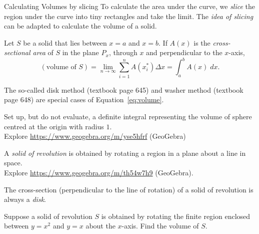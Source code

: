 \documentclass[../main.tex]{subfiles}
\begin{document}
\begin{lesson}{Calculating Volumes by slicing}
  To calculate the area under the curve, we \emph{slice} the region under the curve into tiny rectangles and take the limit. The \emph{idea of slicing} can be adapted to calculate the volume of a solid.

  \begin{mdframed}[style=withref]
    Let \(S\) be a solid that lies between \(x=a\) and \(x=b\). If \(A(x)\) is the \emph{cross-sectional area} of \(S\) in the plane \(P_{x}\), through \(x\) and perpendicular to the \(x\)-axis, 
    \begin{equation} \label{eq:volume}
      (\text{volume of } S) = \lim_{n \to \infty} \sum_{i=1}^{n} A(x_{i}^{*}) \Delta x = \int_{a}^{b} A(x) \;dx.
    \end{equation}

    The so-called disk method (textbook page 645) and washer method (textbook page 648) are special cases of Equation~\eqref{eq:volume}.
  \end{mdframed}
  \vspace{2in}

  \begin{example}
    Set up, but do not evaluate, a definite integral representing the volume of sphere centred at the origin with radius $1$. \\
    {\footnotesize Explore \url{https://www.geogebra.org/m/yse5hfrf} (GeoGebra)}
  \end{example}
  \clearpage


  A \emph{solid of revolution} is obtained by rotating a region in a plane about a line in space. \\
  {\footnotesize Explore \url{https://www.geogebra.org/m/th54w7h9} (GeoGebra).}


  The cross-section (perpendicular to the line of rotation) of a solid of revolution is always a \emph{disk}. 
  \vspace{2in}


  \begin{example}
    Suppose a solid of revolution $S$ is obtained by rotating the finite region enclosed between $y = x^{2}$ and $y = x$ about the $x$-axis. Find the volume of $S$.


\end{example}
\end{lesson}
\end{document}
